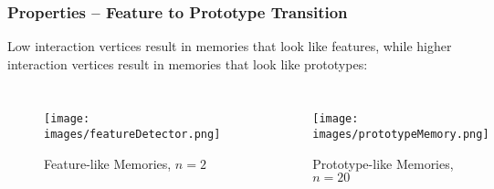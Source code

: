 

    

\begin{frame}
    \frametitle{Properties -- Feature to Prototype Transition}

Low interaction vertices result in memories that look like features, while higher interaction vertices result in memories that look like prototypes:

\begin{columns}
    \begin{figure}
        \texttt{[image: images/featureDetector.png]}
        \caption{Feature-like Memories, \(n=2\)}
    \end{figure}
    \pause
    \begin{figure}
        \texttt{[image: images/prototypeMemory.png]}
        \caption{Prototype-like Memories, \(n=20\)}
    \end{figure}
\end{columns}
\end{frame}